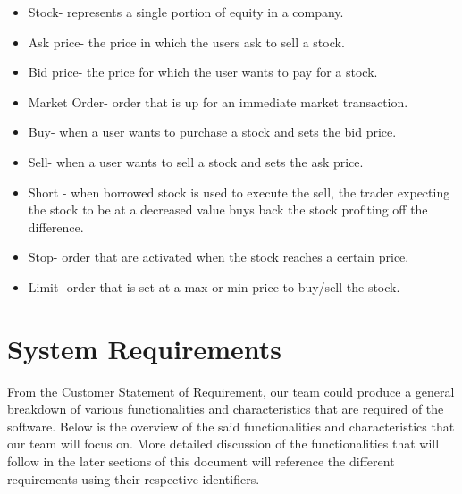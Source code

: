 \documentclass[11pt,letterpaper,oneside]{memoir}
\begin{document}
\begin{itemize}
\item Stock- represents a single portion of  equity in a company.
\item Ask price- the price in which the users ask to sell a stock. 
\item Bid price- the price for which the user wants to pay for a stock.
\item Market Order- order that is up for an immediate market transaction. 
\item Buy- when a user wants to purchase a stock and sets the bid price. 
\item Sell- when a user wants to sell a stock and sets the ask price. 
\item Short - when borrowed stock is used to execute the sell, the trader expecting the stock to be at a decreased value buys back the stock profiting off the difference. 
\item Stop- order that are activated when the stock reaches a certain price. 
\item Limit- order that is set at a max or min price to buy/sell the stock. 
\end{itemize}

\chapter{System Requirements}

From the Customer Statement of Requirement, our team could produce a general breakdown of various functionalities and characteristics that are required of the software. Below is the overview of the said functionalities and characteristics that our team will focus on. More detailed discussion of the functionalities that will follow in the later sections of this document will reference the different requirements using their respective identifiers. 
\end{document}
